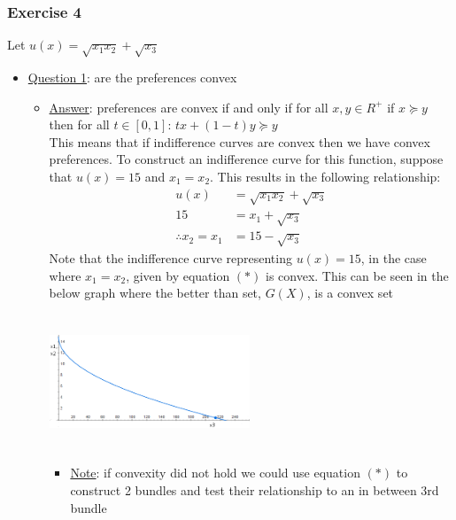 \documentclass{article}
\begin{document}
\par
\vspace{6mm}
\subsubsection{Exercise 4}
Let $u(x) = \sqrt{x_{1}x_{2}} + \sqrt{x_{3}}$
\par \vspace{0.3em}
\begin{itemize}
  \item  \underline{Question 1}: are the preferences convex
  \begin{itemize}
    \item  \underline{Answer}: preferences are convex if and only if for all $x,y \in R^{+}$ if $x \succeq y$ then for all $t \in [0,1]$: $tx + (1-t)y \succeq y$ \\ This means that if indifference curves are convex then we have convex preferences. To construct an indifference curve for this function, suppose that $u(x) = 15$ and $x_{1} = x_{2}$. This results in the following relationship:
    \begin{align*}
      u(x) &= \sqrt{x_{1}x_{2}} + \sqrt{x_{3}} \\
      15 &= x_{1} + \sqrt{x_{3}} \\
      \therefore x_{2} = x_{1} &= 15 - \sqrt{x_{3}} \ \tag{*}
    \end{align*}
    Note that the indifference curve representing $u(x) = 15$, in the case where $x_{1} = x_{2}$, given by equation $(*)$ is convex. This can be seen in the below graph where the better than set, $G(X)$, is a convex set \\
    \begin{center}
      \includegraphics[width=6cm, height=4cm]{pic26}
    \end{center}
    \begin{itemize}
      \item  \underline{Note}: if convexity did not hold we could use equation $(*)$ to construct 2 bundles and test their relationship to an in between 3rd bundle
    \end{itemize}

\end{itemize}
\end{itemize}
\end{document}
